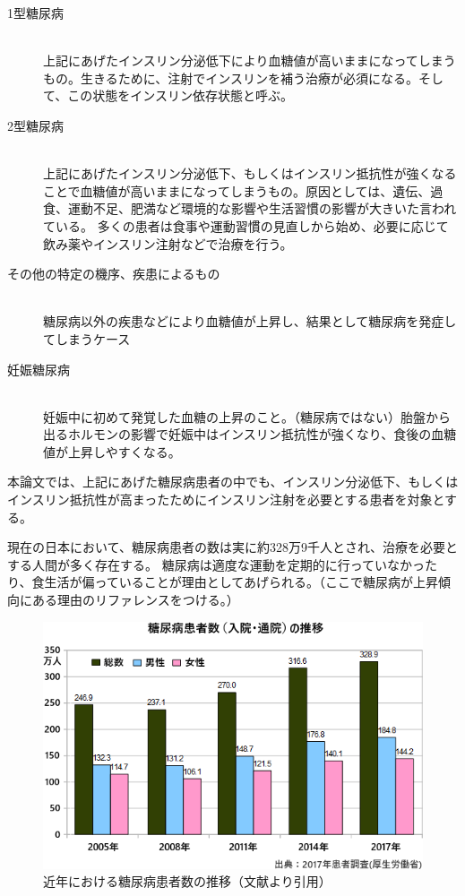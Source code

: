 \begin{description}
  \item [1型糖尿病]\mbox{}\\
    上記にあげたインスリン分泌低下により血糖値が高いままになってしまうもの。生きるために、注射でインスリンを補う治療が必須になる。そして、この状態をインスリン依存状態と呼ぶ。
  \item [2型糖尿病]\mbox{}\\
    上記にあげたインスリン分泌低下、もしくはインスリン抵抗性が強くなることで血糖値が高いままになってしまうもの。原因としては、遺伝、過食、運動不足、肥満など環境的な影響や生活習慣の影響が大きいた言われている。
    多くの患者は食事や運動習慣の見直しから始め、必要に応じて飲み薬やインスリン注射などで治療を行う。
  \item [その他の特定の機序、疾患によるもの]\mbox{}\\
    糖尿病以外の疾患などにより血糖値が上昇し、結果として糖尿病を発症してしまうケース
  \item [妊娠糖尿病]\mbox{}\\
    妊娠中に初めて発覚した血糖の上昇のこと。（糖尿病ではない）胎盤から出るホルモンの影響で妊娠中はインスリン抵抗性が強くなり、食後の血糖値が上昇しやすくなる。
\end{description}

本論文では、上記にあげた糖尿病患者の中でも、インスリン分泌低下、もしくはインスリン抵抗性が高まったためにインスリン注射を必要とする患者を対象とする。

現在の日本において、糖尿病患者の数は実に約328万9千人とされ、治療を必要とする人間が多く存在する。\cite{diabetes_statistics}
糖尿病は適度な運動を定期的に行っていなかったり、食生活が偏っていることが理由としてあげられる。（ここで糖尿病が上昇傾向にある理由のリファレンスをつける。）

\begin{figure}[htbp]
  \caption{近年における糖尿病患者数の推移（文献\cite{diabetes_statistics}より引用）}
  \label{fig:diabetes_total_number_2}
  \begin{center}
    \includegraphics[bb=0 0 900 400,width=25cm]{assets/diabetes_total_number.png}
  \end{center}
\end{figure}


